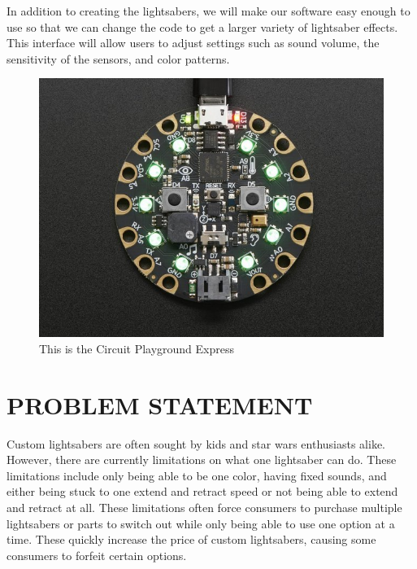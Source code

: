 \documentclass[12pt]{article}
\begin{document}
In addition to creating the lightsabers, we will make our software easy enough to use so that we can change the code to get a larger variety of lightsaber effects. This interface will allow users to adjust settings such as sound volume, the sensitivity of the sensors, and color patterns.


\begin{figure}[!t]
\centering
\includegraphics[width=4.5in]{cpx01.jpg}
\caption{This is the Circuit Playground Express}
\label{fig:cpx}
\end{figure}

\section{PROBLEM STATEMENT}

Custom lightsabers are often sought by kids and star wars enthusiasts alike. However, there are currently limitations on what one lightsaber can do. These limitations include only being able to be one color, having fixed sounds, and either being stuck to one extend and retract speed or not being able to extend and retract at all. These limitations often force consumers to purchase multiple lightsabers or parts to switch out while only being able to use one option at a time. These quickly increase the price of custom lightsabers, causing some consumers to forfeit certain options. 
\end{document}
